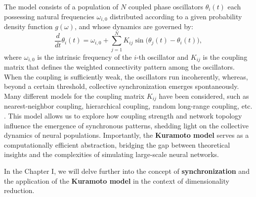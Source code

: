 \documentclass[../main.tex]{subfiles}
\begin{document}
The model consists of a population of $N$ coupled phase oscillators $\theta_i(t)$ each possessing natural frequencies $\omega_{i,0}$ distributed according to a given probability density function $g(\omega)$, and whose dynamics are governed by: 
\begin{equation}
    \displaystyle\frac{d}{dt}\theta_i(t) = \omega_{i,0} + \displaystyle\sum_{j=1}^{N}K_{ij}\sin\big(\theta_j(t)-\theta_i(t) \big),
    \label{eq:kuramoto}
\end{equation}
where $\omega_{i,0}$ is the intrinsic frequency of the $i$-th oscillator and $K_{ij}$ is the coupling matrix that defines the weighted connectivity pattern among the oscillators.
When the coupling is sufficiently weak, the oscillators run incoherently, whereas, beyond a certain threshold, collective synchronization emerges spontaneously.
Many different models for the coupling matrix $K_{ij}$ have been considered, such as nearest-neighbor coupling, hierarchical coupling, random long-range coupling, etc. \citep{acebron2005kuramoto}.
This model allows us to explore how coupling strength and network topology influence the emergence of synchronous patterns, shedding light on the collective dynamics of neural populations.
Importantly, the \textbf{Kuramoto model} serves as a computationally efficient abstraction, bridging the gap between theoretical insights and the complexities of simulating large-scale neural networks.

In the Chapter I, we will delve further into the concept of \textbf{synchronization} and the application of the \textbf{Kuramoto model} in the context of dimensionality reduction.
\end{document}
